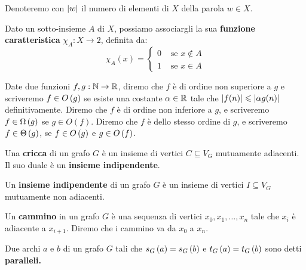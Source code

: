 \documentclass[\main/main.tex]{subfiles}
\begin{document}
\begin{multicols}{2}
\begin{definition}
        Denoteremo con \(\left\lvert w\right\rvert\) il numero di elementi di \(X\) della parola \(w \in X\).
    \end{definition}
    \begin{definition}
        Dato un sotto-insieme \(A\) di \(X\), possiamo associargli la sua \textbf{funzione caratteristica} \(\chi_A: X \rightarrow 2\), definita da:
        \[
            \chi_{A}(x)=\left\{\begin{array}{ll}{0} & {\text { se } x \notin A} \\ {1} & {\text { se } x \in A}\end{array}\right.
        \]
    \end{definition}
    \begin{definition}
        Date due funzioni \(f,g: \mathbb{N} \rightarrow \mathbb{R} \), diremo che \(f\) è di ordine non superiore a \(g\) e scriveremo \(f \in O\left(g\right)\) se esiste una costante \(\alpha \in \mathbb{R}\) tale che \(\left\lvert f(n)\right\rvert \leqslant \left\lvert\alpha g(n)\right\rvert\) definitivamente. Diremo che \(f\) è di ordine non inferiore a \(g\), e scriveremo \(f \in \Omega\left(g\right)\) se \(g \in O(f)\). Diremo che \(f\) è dello stesso ordine di \(g\), e scriveremo \(f \in \Theta\left(g\right)\), se \(f \in O\left(g\right)\) e \(g \in O\left(f\right)\). 
    \end{definition}
    \begin{definition}
        Una \textbf{cricca} di un grafo \(G\) è un insieme di vertici \(C \subseteq V_G\) mutuamente adiacenti. Il suo duale è un \textbf{insieme indipendente}.
    \end{definition}
    \begin{definition}
        Un \textbf{insieme indipendente} di un grafo \(G\) è un insieme di vertici \(I \subseteq V_G\) mutuamente non adiacenti.
    \end{definition}
    \begin{definition}[Cammino]
        Un \textbf{cammino} in un grafo \(G\) è una sequenza di vertici \(x_0, x_1, \ldots, x_n\) tale che \(x_i\) è adiacente a \(x_{i+1}\). Diremo che i cammino va da \(x_0\) a \(x_n\).
    \end{definition}
    \begin{definition}
        Due archi \(a\) e \(b\) di un grafo \(G\) tali che \(s_G\left(a\right) = s_G\left(b\right)\) e \(t_G\left(a\right) = t_G\left(b\right)\) sono detti \textbf{paralleli.}
    \end{definition}
    \begin{definition}

\end{definition}
\end{multicols}
\end{document}
